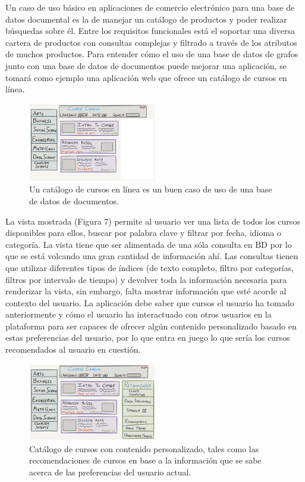 \documentclass[conference]{IEEEtran}
\begin{document}
Un caso de uso b\'asico en aplicaciones de comercio electr\'onico para una base de datos documental es la de manejar un cat\'alogo de productos y poder realizar b\'usquedas sobre \'el. Entre los requisitos funcionales está el soportar una diversa cartera de productos con consultas complejas y filtrado a trav\'es de los atributos de muchos productos. Para entender c\'omo el uso de una base de datos de grafos  junto con una base de datos de documentos puede mejorar una aplicaci\'on, se tomar\'a como ejemplo una aplicaci\'on web que ofrece un cat\'alogo de cursos en l\'inea.

\begin{figure}[!h]
\centering
\includegraphics[width=0.5\textwidth]{6}
\caption{Un cat\'alogo de cursos en l\'inea es un buen caso de uso de una base de datos de documentos.}
\label{fig6}
\end{figure}

La vista mostrada (Figura 7) permite al usuario ver una lista de todos los cursos disponibles para ellos, buscar por palabra clave y filtrar por fecha, idioma o categor\'ia. La vista tiene que ser alimentada de una s\'ola consulta en BD por lo que se est\'a volcando una gran cantidad de informaci\'on ah\'i. Las consultas tienen que utilizar diferentes tipos de \'indices (de texto completo, filtro por categor\'ias, filtros por intervalo de tiempo) y devolver toda la informaci\'on necesaria para renderizar la vista, sin embargo, falta mostrar informaci\'on que est\'e acorde al contexto del usuario. La aplicaci\'on debe saber que cursos el usuario ha tomado anteriormente y c\'omo el usuario ha interactuado con otros usuarios en la plataforma para ser capaces de ofrecer alg\'un contenido personalizado basado en estas preferencias del usuario, por lo que entra en juego lo que ser\'ia los cursos recomendados al usuario en cuesti\'on.

\begin{figure}[!h]
\centering
\includegraphics[width=0.5\textwidth]{7}
\caption{Cat\'alogo de cursos con contenido personalizado, tales como las recomendaciones de cursos en base a la informaci\'on que se sabe acerca de las preferencias del usuario actual.}
\label{fig7}
\end{figure}
\end{document}
